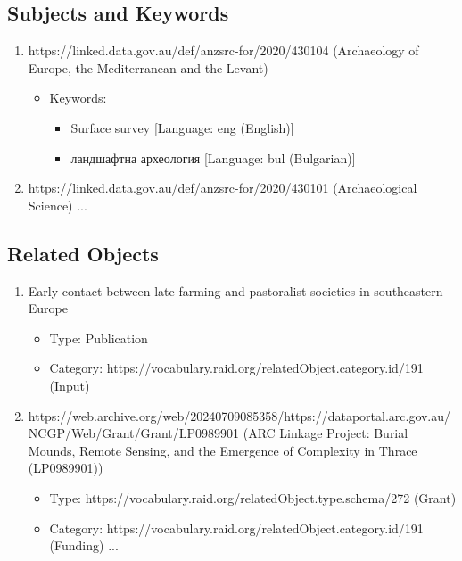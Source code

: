 \documentclass[a0,portrait]{a0poster}
\begin{document}
\begin{multicols}{2}
\begin{tiny}
\subsection*{Subjects and Keywords}
\begin{enumerate}
\item https://linked.data.gov.au/def/anzsrc-for/2020/430104 (Archaeology of Europe, the Mediterranean and the Levant)
   \begin{itemize}
   \item Keywords:
   \begin{itemize}
   \item Surface survey [Language: eng (English)]
   \item \textrussian{ландшафтна археология} [Language: bul (Bulgarian)]
   \end{itemize}
   \end{itemize}

\item https://linked.data.gov.au/def/anzsrc-for/2020/430101 (Archaeological Science) ...

\end{enumerate}

\subsection*{Related Objects}
\begin{enumerate}
\item Early contact between late farming and pastoralist societies in southeastern Europe
   \begin{itemize}
   \item Type: Publication
   \item Category: https://vocabulary.raid.org/relatedObject.category.id/191 (Input)
   \end{itemize}

\item https://web.archive.org/web/20240709085358/https://dataportal.arc.gov.au/NCGP/Web/Grant/Grant/LP0989901 (ARC Linkage Project: Burial Mounds, Remote Sensing, and the Emergence of Complexity in Thrace (LP0989901))
   \begin{itemize}
   \item Type: https://vocabulary.raid.org/relatedObject.type.schema/272 (Grant)
   \item Category: https://vocabulary.raid.org/relatedObject.category.id/191 (Funding) ...
   \end{itemize}
\end{enumerate}


\end{tiny}
\end{multicols}
\end{document}
